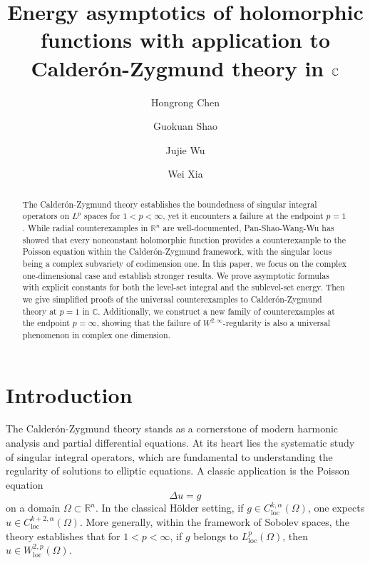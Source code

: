 \documentclass[12pt,twoside]{amsart}
\title[Energy asymptotics of holomorphic functions with application to Calder\'{o}n-Zygmund theory in $\C$]{Energy asymptotics of holomorphic functions with application to Calder\'{o}n-Zygmund theory in $\C$}
\author{Hongrong Chen}
\author{Guokuan Shao}
\author{Jujie Wu}
\author{Wei Xia}
\newcommand{\C}{\ensuremath{\mathbb{C}}}
\numberwithin{equation}{section}
\numberwithin{definition}{section} %
\begin{document}
\begin{abstract}
The Calder\'on-Zygmund theory establishes the boundedness of singular integral operators on \(L^p\) spaces for \(1 < p < \infty\), yet it encounters a failure at the endpoint \(p = 1\). While radial counterexamples in \(\mathbb{R}^n\) are well-documented, Pan-Shao-Wang-Wu \cite{psww2026} has showed that every nonconstant holomorphic function provides a counterexample to the Poisson equation within the Calder\'on-Zygmund framework, with the singular locus being a complex subvariety of codimension one. In this paper, we focus on the complex one-dimensional case and establish stronger results. We prove asymptotic formulas with explicit constants for both the level-set integral and the sublevel-set energy. Then we give simplified proofs of the universal counterexamples to Calder\'on-Zygmund theory at \(p = 1\) in $\C$. Additionally, we construct a new family of counterexamples at the endpoint \(p = \infty\), showing that the failure of \(W^{2,\infty}\)-regularity is also a universal phenomenon in complex one dimension.
  \bigskip



  \smallskip

\end{abstract}

\maketitle

\tableofcontents

\section{Introduction}
The Calder\'on-Zygmund theory \cite{GT} stands as a cornerstone of modern harmonic analysis and partial differential equations. At its heart lies the systematic study of singular integral operators, which are fundamental to understanding the regularity of solutions to elliptic equations. A classic application is the Poisson equation
\[
\Delta u = g
\]
on a domain \(\Omega \subset \mathbb{R}^n\). In the classical H\"older setting, if \(g \in C^{k,\alpha}_\mathrm{loc}(\Omega)\), one expects \(u \in C^{k+2,\alpha}_\mathrm{loc}(\Omega)\). More generally, within the framework of Sobolev spaces, the theory establishes that for \(1 < p < \infty\), if \(g\) belongs to \(L_{\mathrm{loc}}^p(\Omega)\), then \(u\in W_{\mathrm{loc}}^{2,p}(\Omega)\).
\end{document}
